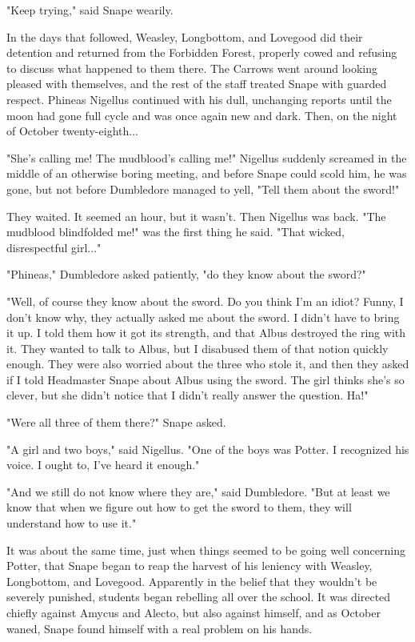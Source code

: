 \documentclass[a4paper,11pt]{article}
\begin{document}
"Keep trying," said Snape wearily.

In the days that followed, Weasley, Longbottom, and Lovegood did their detention and returned from the Forbidden Forest, properly cowed and refusing to discuss what happened to them there. The Carrows went around looking pleased with themselves, and the rest of the staff treated Snape with guarded respect. Phineas Nigellus continued with his dull, unchanging reports until the moon had gone full cycle and was once again new and dark. Then, on the night of October twenty-eighth...

"She's calling me! The mudblood's calling me!" Nigellus suddenly screamed in the middle of an otherwise boring meeting, and before Snape could scold him, he was gone, but not before Dumbledore managed to yell, "Tell them about the sword!"

They waited. It seemed an hour, but it wasn't. Then Nigellus was back. "The mudblood blindfolded me!" was the first thing he said. "That wicked, disrespectful girl..."

"Phineas," Dumbledore asked patiently, "do they know about the sword?"

"Well, of course they know about the sword. Do you think I'm an idiot? Funny, I don't know why, they actually asked me about the sword. I didn't have to bring it up. I told them how it got its strength, and that Albus destroyed the ring with it. They wanted to talk to Albus, but I disabused them of that notion quickly enough. They were also worried about the three who stole it, and then they asked if I told Headmaster Snape about Albus using the sword. The girl thinks she's so clever, but she didn't notice that I didn't really answer the question. Ha!"

"Were all three of them there?" Snape asked.

"A girl and two boys," said Nigellus. "One of the boys was Potter. I recognized his voice. I ought to, I've heard it enough."

"And we still do not know where they are," said Dumbledore. "But at least we know that when we figure out how to get the sword to them, they will understand how to use it."

It was about the same time, just when things seemed to be going well concerning Potter, that Snape began to reap the harvest of his leniency with Weasley, Longbottom, and Lovegood. Apparently in the belief that they wouldn't be severely punished, students began rebelling all over the school. It was directed chiefly against Amycus and Alecto, but also against himself, and as October waned, Snape found himself with a real problem on his hands.
\end{document}

